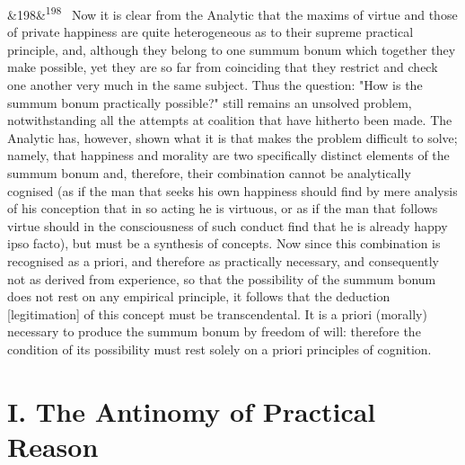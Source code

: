 \documentclass[12pt]{article}
\newcommand{\para}[1][]{\par\noindent\ifx&#1&\else\textsuperscript{\footnotesize #1}~\fi}
\begin{document}
\para[198] Now it is clear from the Analytic that the maxims of virtue and those of private happiness are quite heterogeneous as to their supreme practical principle, and, although they belong to one summum bonum which together they make possible, yet they are so far from coinciding that they restrict and check one another very much in the same subject. Thus the question: "How is the summum bonum practically possible?" still remains an unsolved problem, notwithstanding all the attempts at coalition that have hitherto been made. The Analytic has, however, shown what it is that makes the problem difficult to solve; namely, that happiness and morality are two specifically distinct elements of the summum bonum and, therefore, their combination cannot be analytically cognised (as if the man that seeks his own happiness should find by mere analysis of his conception that in so acting he is virtuous, or as if the man that follows virtue should in the consciousness of such conduct find that he is already happy ipso facto), but must be a synthesis of concepts. Now since this combination is recognised as a priori, and therefore as practically necessary, and consequently not as derived from experience, so that the possibility of the summum bonum does not rest on any empirical principle, it follows that the deduction [legitimation] of this concept must be transcendental. It is a priori (morally) necessary to produce the summum bonum by freedom of will: therefore the condition of its possibility must rest solely on a priori principles of cognition.

\section*{I. The Antinomy of Practical Reason}
\end{document}
